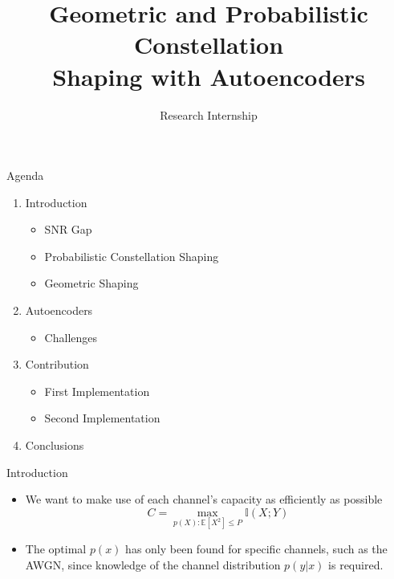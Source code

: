 \documentclass[english,aspectratio=1610,9pt,helvet,nicetitles]{ICEbeamerTUMCD}
\title{Geometric and Probabilistic Constellation\\ \vspace{0.5cm} Shaping with Autoencoders}
\subtitle{Research Internship} %
\author{\PersonVorname{} \PersonNachname{}}
\institute[]{Technical University of Munich \\ Institute for Communications Engineering}
\begin{document}
\setlength{\baselineskip}{\PraesentationAbstandAbsatz}
\setlength{\parskip}{\baselineskip}
\PraesentationMasterStandard

\PraesentationTitelseite %

\begin{frame}{Agenda}
  \begin{enumerate}
  \item Introduction
  	\begin{itemize}
  	\item SNR Gap
  	\item Probabilistic Constellation Shaping
  	\item Geometric Shaping
  	\end{itemize}
  \item Autoencoders
	\begin{itemize}
	\item Challenges
  	\end{itemize}
  \item Contribution
  \begin{itemize}
  	\item First Implementation
  	\item Second Implementation
  \end{itemize}
  \item Conclusions
  \end{enumerate}
  
\end{frame}


\begin{frame}{Introduction}
  \begin{itemize}
  \item We want to make use of each channel's capacity as efficiently as possible
  $$ C = \max_{p(X): \mathbb{E}[X^2] \leq P} \mathbb{I}(X;Y)$$
  \item The optimal $p(x)$ has only been found for specific channels, such as the AWGN, since knowledge of the channel distribution $p(y|x)$ is required.
  \end{itemize}
  \begin{minipage}{0.5\linewidth}
    
  \end{minipage}%
  \begin{minipage}{0.5\linewidth}
    
  \end{minipage}
  
\end{frame}
\end{document}
